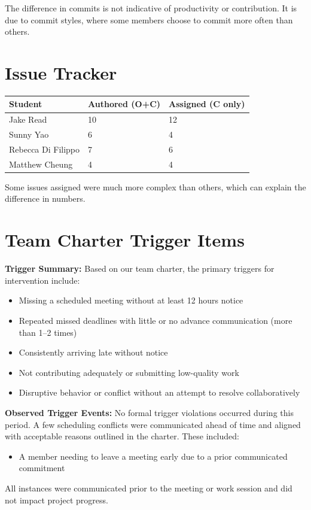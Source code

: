 \documentclass{article}
\begin{document}
The difference in commits is not indicative of productivity or contribution.
It is due to commit styles, where some members choose to commit more often than others.


\section{Issue Tracker}


\begin{table}[H]
\centering
\begin{tabular}{lll}
\toprule
\textbf{Student} & \textbf{Authored (O+C)} & \textbf{Assigned (C only)}\\
\midrule
Jake Read & 10 & 12 \\ %
Sunny Yao & 6 & 4 \\ %
Rebecca Di Filippo & 7 & 6 \\ %
Matthew Cheung & 4 & 4 \\ %
\bottomrule
\end{tabular}
\end{table}

Some issues assigned were much more complex than others, which can explain the difference in numbers.


\section{Team Charter Trigger Items}

\textbf{Trigger Summary:}
Based on our team charter, the primary triggers for intervention include:  %
\begin{itemize}
\item Missing a scheduled meeting without at least 12 hours notice  %
\item Repeated missed deadlines with little or no advance communication (more than 1--2 times)  %
\item Consistently arriving late without notice  %
\item Not contributing adequately or submitting low-quality work  %
\item Disruptive behavior or conflict without an attempt to resolve collaboratively  %
\end{itemize}

\textbf{Observed Trigger Events:}
No formal trigger violations occurred during this period.
A few scheduling conflicts were communicated ahead of time and aligned with acceptable reasons outlined in the charter.
These included:
\begin{itemize}
\item A member needing to leave a meeting early due to a prior communicated commitment
\end{itemize}
All instances were communicated prior to the meeting or work session and did not impact project progress.
\medskip{}
\end{document}
